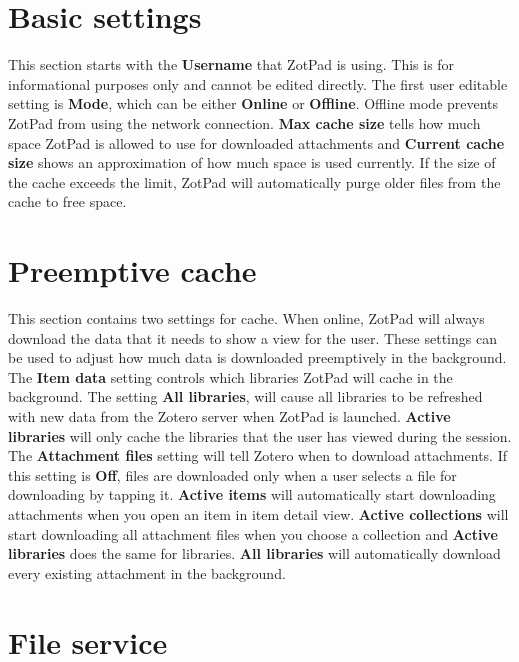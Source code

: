 \documentclass[oneside, openany, 12pt]{tufte-book}
\begin{document}
\section{Basic settings}

This section starts with the \textbf{Username} that ZotPad is using. This is for informational purposes only and cannot be edited directly. The first user editable setting is \textbf{Mode}, which can be either \textbf{Online} or \textbf{Offline}. Offline mode prevents ZotPad from using the network connection. \textbf{Max cache size} tells how much space ZotPad is allowed to use for downloaded attachments and \textbf{Current cache size} shows an approximation of how much space is used currently. If the size of the cache exceeds the limit, ZotPad will automatically purge older files from the cache to free space.

\section{Preemptive cache}

This section contains two settings for cache. When online, ZotPad will always download the data that it needs to show a view for the user. These settings can be used to adjust how much data is downloaded preemptively in the background. The \textbf{Item data} setting controls which libraries ZotPad will cache in the background. The setting \textbf{All libraries}, will cause all libraries to be refreshed with new data from the Zotero server when ZotPad is launched. \textbf{Active libraries} will only cache the libraries that the user has viewed during the session. The \textbf{Attachment files} setting will tell Zotero when to download attachments. If this setting is \textbf{Off}, files are downloaded only when a user selects a file for downloading by tapping it. \textbf{Active items} will automatically start downloading attachments when you open an item in item detail view. \textbf{Active collections} will start downloading all attachment files when you choose a collection and \textbf{Active libraries} does the same for libraries. \textbf{All libraries} will automatically download every existing attachment in the background.

\section{File service}
\end{document}
